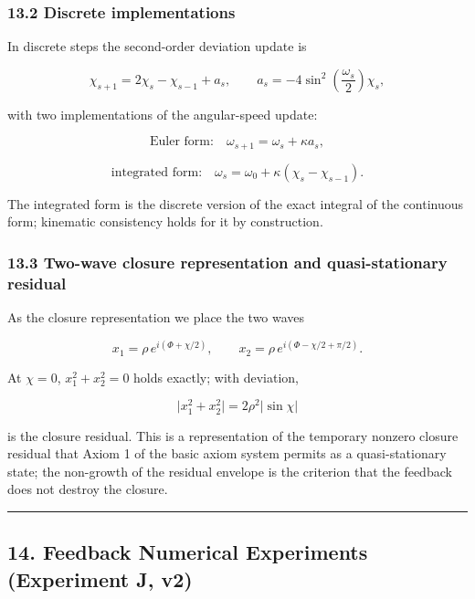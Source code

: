 \documentclass[
  a4paper,
]{article}
\begin{document}
\subsubsection{13.2 Discrete
implementations}\label{discrete-implementations}

In discrete steps the second-order deviation update is

\[
\chi_{s+1}=2\chi_s-\chi_{s-1}+a_s,
\qquad
a_s=-4\sin^2\!\left(\frac{\omega_s}{2}\right)\chi_s,
\]

with two implementations of the angular-speed update:

\[
\text{Euler form:}\quad
\omega_{s+1}=\omega_s+\kappa a_s,
\]

\[
\text{integrated form:}\quad
\omega_s=\omega_0+\kappa(\chi_s-\chi_{s-1}).
\]

The integrated form is the discrete version of the exact integral of the
continuous form; kinematic consistency holds for it by construction.

\subsubsection{13.3 Two-wave closure representation and quasi-stationary
residual}\label{two-wave-closure-representation-and-quasi-stationary-residual}

As the closure representation we place the two waves

\[
x_1=\rho\,e^{i(\Phi+\chi/2)},
\qquad
x_2=\rho\,e^{i(\Phi-\chi/2+\pi/2)}.
\]

At \(\chi=0\), \(x_1^2+x_2^2=0\) holds exactly; with deviation,

\[
\lvert x_1^2+x_2^2\rvert=2\rho^2\lvert\sin\chi\rvert
\]

is the closure residual. This is a representation of the temporary
nonzero closure residual that Axiom 1 of the basic axiom system permits
as a quasi-stationary state; the non-growth of the residual envelope is
the criterion that the feedback does not destroy the closure.

\begin{center}\rule{0.5\linewidth}{0.5pt}\end{center}

\subsection{14. Feedback Numerical Experiments (Experiment J,
v2)}\label{feedback-numerical-experiments-experiment-j-v2}
\end{document}
